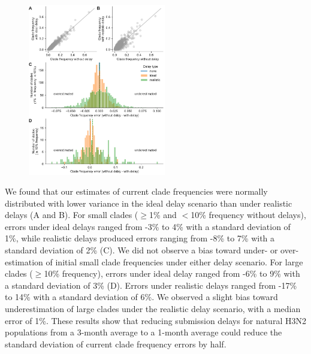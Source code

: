 \documentclass[9pt,lineno]{elife}
\begin{document}
\begin{figure}[htb]
{\includegraphics[width=6cm]{figures/simulated_current_frequency_errors_by_delay}}\label{figsupp:simulated_current_clade_frequency_errors}
%
\label{figdata:h3n2_tip_attributes}
\label{figsrccode:current_clade_frequency_errors}
\end{figure}

We found that our estimates of current clade frequencies were normally distributed with lower variance in the ideal delay scenario than under realistic delays (A and B).
For small clades ($\ge$1\% and $<$10\% frequency without delays), errors under ideal delays ranged from -3\% to 4\% with a standard deviation of 1\%, while realistic delays produced errors ranging from -8\% to 7\% with a standard deviation of 2\% (C).
We did not observe a bias toward under- or over-estimation of initial small clade frequencies under either delay scenario.
For large clades ($\ge$10\% frequency), errors under ideal delay ranged from -6\% to 9\% with a standard deviation of 3\% (D).
Errors under realistic delays ranged from -17\% to 14\% with a standard deviation of 6\%.
We observed a slight bias toward underestimation of large clades under the realistic delay scenario, with a median error of 1\%.
These results show that reducing submission delays for natural H3N2 populations from a 3-month average to a 1-month average could reduce the standard deviation of current clade frequency errors by half.
\end{document}
